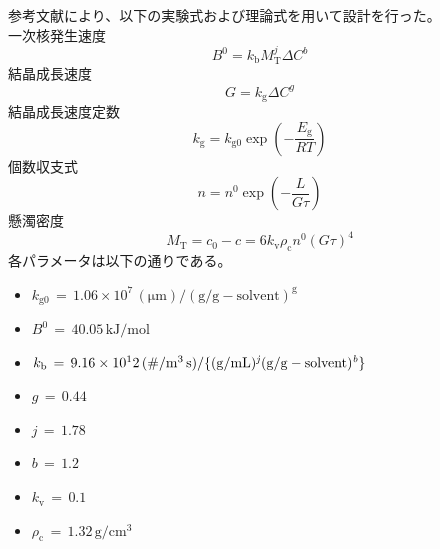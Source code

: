 \documentclass[a4j]{jsreport}
\begin{document}
参考文献\cite{晶析}により、以下の実験式および理論式を用いて設計を行った。\\
一次核発生速度
\begin{equation}
    B^0 = k_{\mathrm{ b}}M_{\mathrm{ T}}^j \Delta C^b
\end{equation}
結晶成長速度
\begin{equation}
    G = k_{\mathrm{ g}}\Delta C^g
\end{equation}
結晶成長速度定数
\begin{equation}
    k_{\mathrm{ g}} = k_{\mathrm{ g0}} \exp(-\frac{E_{\mathrm{ g}}}{RT})
\end{equation}
個数収支式
\begin{equation}
    n=n^0 \exp(-\frac{L}{G\tau})
\end{equation}
懸濁密度
\begin{equation}
    M_{\mathrm{ T}} = c_0-c = 6k_{\mathrm{ v}}\rho_{\mathrm{ c}}n^0(G\tau)^4
\end{equation}
各パラメータは以下の通りである。
\begin{itemize}
    \item[] $k_{\mathrm{ g0}}\,=\,1.06\times10^7\,\mathrm{ (\mu m)/(g/g-solvent)^g}$
    \item[] $B^{\mathrm{ 0}}\,=\,40.05\,\mathrm{ kJ/mol}$
    \item[] $k_{\mathrm{ b}}\,=\,9.16\times10^12\,\mathrm{ (\#/ m^3\,s)/\{(g/mL)^{{\it j}}(g/g-solvent)^{{\it b}}\}}$
    \item[] $g\,=\,0.44\,$
    \item[] $j\,=\,1.78\,$
    \item[] $b\,=\,1.2\,$
    \item[] $k_{\mathrm{ v}}\,=\,0.1\,$
    \item[] $\rho_{\mathrm{ c}}\,=\,1.32\,\mathrm{ g/cm^3}$ 
\end{itemize}
\end{document}
